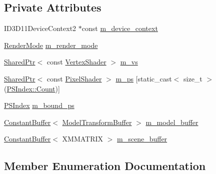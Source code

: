 \subsection*{Private Attributes}
\begin{DoxyCompactItemize}
\item 
I\+D3\+D11\+Device\+Context2 $\ast$const \hyperlink{classmage_1_1_shading_normal_pass_aa4172e272ab2da77b91cd01db60a10e3}{m\+\_\+device\+\_\+context}
\item 
\hyperlink{namespacemage_a5e7e18b0154373ce8fc942fe3f6b27fd}{Render\+Mode} \hyperlink{classmage_1_1_shading_normal_pass_a0048886bc80b9b39c1dc5d17e5b68584}{m\+\_\+render\+\_\+mode}
\item 
\hyperlink{namespacemage_a1e01ae66713838a7a67d30e44c67703e}{Shared\+Ptr}$<$ const \hyperlink{classmage_1_1_vertex_shader}{Vertex\+Shader} $>$ \hyperlink{classmage_1_1_shading_normal_pass_a2d227df93562e05bbf9f1f515ee2db62}{m\+\_\+vs}
\item 
\hyperlink{namespacemage_a1e01ae66713838a7a67d30e44c67703e}{Shared\+Ptr}$<$ const \hyperlink{namespacemage_ac98506b7edd999ea43ec46fbd0330238}{Pixel\+Shader} $>$ \hyperlink{classmage_1_1_shading_normal_pass_a224c8553f634749a231eff291c79edeb}{m\+\_\+ps} \mbox{[}static\+\_\+cast$<$ size\+\_\+t $>$(\hyperlink{classmage_1_1_shading_normal_pass_a6d277753d26a7854c448b3e0d9275b19ae93f994f01c537c4e2f7d8528c3eb5e9}{P\+S\+Index\+::\+Count})\mbox{]}
\item 
\hyperlink{classmage_1_1_shading_normal_pass_a6d277753d26a7854c448b3e0d9275b19}{P\+S\+Index} \hyperlink{classmage_1_1_shading_normal_pass_aad8c7d37622cbd1dafd3dd49b590fd54}{m\+\_\+bound\+\_\+ps}
\item 
\hyperlink{structmage_1_1_constant_buffer}{Constant\+Buffer}$<$ \hyperlink{structmage_1_1_model_transform_buffer}{Model\+Transform\+Buffer} $>$ \hyperlink{classmage_1_1_shading_normal_pass_a7068a84cf75fae7156c4cd6e39f0700f}{m\+\_\+model\+\_\+buffer}
\item 
\hyperlink{structmage_1_1_constant_buffer}{Constant\+Buffer}$<$ X\+M\+M\+A\+T\+R\+IX $>$ \hyperlink{classmage_1_1_shading_normal_pass_a98f3cd5d6abc9c3b5e904311722349df}{m\+\_\+scene\+\_\+buffer}
\end{DoxyCompactItemize}


\subsection{Member Enumeration Documentation}
\hypertarget{classmage_1_1_shading_normal_pass_a6d277753d26a7854c448b3e0d9275b19}{}\label{classmage_1_1_shading_normal_pass_a6d277753d26a7854c448b3e0d9275b19} 
